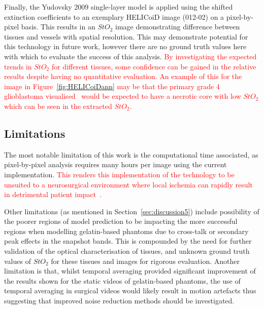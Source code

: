 Finally, the Yudovsky 2009 single-layer model is applied using the shifted extinction coefficients to an exemplary HELICoiD image (012-02) on a pixel-by-pixel basis. This results in an $StO_2$ image demonstrating difference between tissues and vessels with spatial resolution. This may demonstrate potential for this technology in future work, however there are no ground truth values here with which to evaluate the success of this analysis. \textcolor{red}{By investigating the expected trends in $StO_2$ for different tissues, some confidence can be gained in the relative results despite having no quantitative evaluation. An example of this for the image in Figure~\ref{fig:HELICoiDann} may be that the primary grade 4 glioblastoma visualised~\cite{Fabelo2019} would be expected to have a necrotic core with low $StO_2$ which can be seen in the extracted $StO_2$. }

\subsection{Limitations}
The most notable limitation of this work is the computational time associated, as pixel-by-pixel analysis requires many hours per image using the current implementation. \textcolor{red}{This renders this implementation of the technology to be unsuited to a neurosurgical environment where local ischemia can rapidly result in detrimental patient impact~\citep{Zhou2016}.}

Other limitations (as mentioned in Section~\ref{sec:discussion5}) include possibility of the poorer regions of model prediction to be impacting the more successful regions when modelling gelatin-based phantoms due to cross-talk or secondary peak effects in the snapshot bands. This is compounded by the need for further validation of the optical characterisation of tissues, and unknown ground truth values of $StO_2$ for these tissues and images for rigorous evaluation. Another limitation is that, whilst temporal averaging provided significant improvement of the results shown for the static videos of gelatin-based phantoms, the use of temporal averaging in surgical videos would likely result in motion artefacts thus suggesting that improved noise reduction methods should be investigated. 

